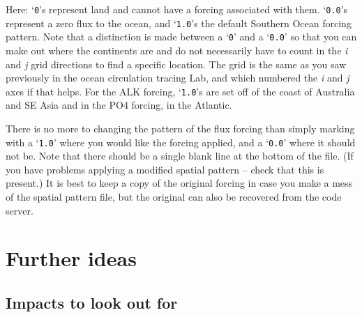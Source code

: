 \documentclass[11pt,fleqn]{book} %
\begin{document}
Here: ‘\texttt{0}’s represent land and cannot have a forcing associated with them. ‘\texttt{0.0}’s represent a zero flux to the ocean, and ‘\texttt{1.0}’s the default Southern Ocean forcing pattern. Note that a distinction is made between a ‘\texttt{0}’ and a ‘\texttt{0.0}’ so that you can make out where the continents are and do not necessarily have to count in the \textit{i} and \textit{j} grid directions to find a specific location. The grid is the same as you saw previously in the ocean circulation tracing Lab, and which numbered the \textit{i} and \textit{j} axes if that helps. For the ALK forcing, ‘\texttt{1.0}’s are set off of the coast of Australia and SE Asia and in the PO4 forcing, in the Atlantic.

There is no more to changing the pattern of the flux forcing than simply marking with a ‘\texttt{1.0}’ where you would like the forcing applied, and a ‘\texttt{0.0}’ where it should not be. Note that there should be a single blank line at the bottom of the file. (If you have problems applying a modified spatial pattern – check that this is present.) It is best to keep a copy of the original forcing in case you make a mess of the spatial pattern file, but the original can also be recovered from the code server.


\newpage


\section{Further ideas}


\subsection{Impacts to look out for}
\end{document}
